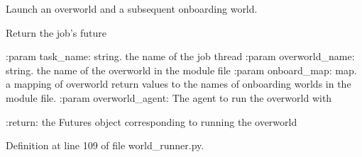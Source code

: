 \begin{DoxyVerb}Launch an overworld and a subsequent onboarding world.

Return the job's future

:param task_name:
    string. the name of the job thread
:param overworld_name:
    string. the name of the overworld in the module file
:param onboard_map:
    map. a mapping of overworld return values to the names
    of onboarding worlds in the module file.
:param overworld_agent:
    The agent to run the overworld with

:return:
    the Futures object corresponding to running the overworld
\end{DoxyVerb}
 

Definition at line 109 of file world\+\_\+runner.\+py.



